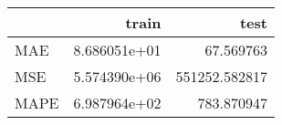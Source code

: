 \begin{tabular}{lrr}
\toprule
{} &         train &           test \\
\midrule
MAE  &  8.686051e+01 &      67.569763 \\
MSE  &  5.574390e+06 &  551252.582817 \\
MAPE &  6.987964e+02 &     783.870947 \\
\bottomrule
\end{tabular}
